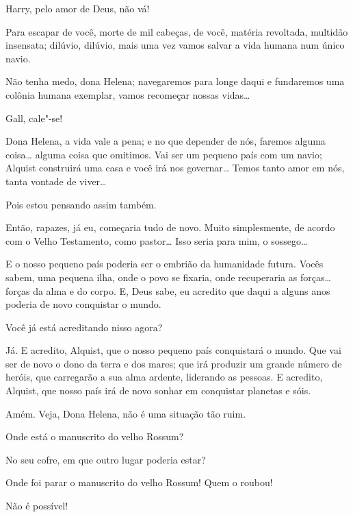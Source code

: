  Harry, pelo amor de Deus, não vá!


  Para escapar de você, morte de mil cabeças,
de você, matéria revoltada, multidão insensata; dilúvio, dilúvio, mais uma vez
vamos salvar a vida humana num único navio.

 Não tenha medo, dona Helena; navegaremos para longe daqui e fundaremos
uma colônia humana exemplar, vamos recomeçar nossas vidas\ldots{}

 Gall, cale"-se!

  Dona Helena, a vida vale a pena; e no que depender
de nós, faremos alguma coisa\ldots{} alguma coisa que omitimos. Vai ser um
pequeno país com um navio; Alquist construirá uma casa e você irá nos
governar\ldots{} Temos tanto amor em nós, tanta vontade de viver\ldots{}

 Pois estou pensando assim também.

 Então, rapazes, já eu, começaria tudo de novo. Muito simplesmente, de acordo
com o Velho Testamento, como pastor\ldots{} Isso seria para mim, o sossego\ldots{}

 E o nosso pequeno país poderia ser o embrião da humanidade futura. Vocês
sabem, uma pequena ilha, onde o povo se fixaria, onde recuperaria as forças\ldots{}
forças da alma e do corpo. E, Deus sabe, eu acredito que daqui a alguns anos
poderia de novo conquistar o mundo.

 Você já está acreditando nisso agora?

 Já. E acredito, Alquist, que o nosso pequeno país conquistará
o mundo. Que vai ser de novo o dono da terra e dos mares; que irá produzir um
grande número de heróis, que carregarão a sua alma ardente, liderando as pessoas.
E acredito, Alquist, que nosso país irá de novo sonhar em conquistar planetas e sóis.

 Amém. Veja, Dona Helena, não é uma situação tão ruim.

  Onde está o manuscrito do velho Rossum?

 No seu cofre, em que outro lugar poderia estar?

 Onde foi parar o manuscrito do velho Rossum! Quem o roubou!

 Não é possível!

